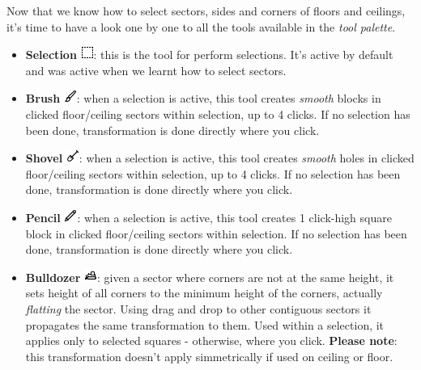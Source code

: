Now that we know how to select sectors, sides and corners of floors and ceilings, it's time to have a look one by one to all the tools available in the \emph{tool palette}.

\begin{itemize}
    \item \textbf{Selection} \includegraphics[scale=0.5]{Resources/icons_toolbox/toolbox_Selection-16.png}: this is the tool for perform selections. It's active by default and was active when we learnt how to select sectors.
    \item \textbf{Brush} \includegraphics[scale=0.5]{Resources/icons_toolbox/toolbox_Paint-16.png}: when a selection is active, this tool creates \emph{smooth} blocks in  clicked floor/ceiling sectors within selection, up to 4 clicks. If no selection has been done, transformation is done directly where you click.
    \item \textbf{Shovel} \includegraphics[scale=0.5]{Resources/icons_toolbox/toolbox_Shovel-16.png}: when a selection is active, this tool creates \emph{smooth} holes in  clicked floor/ceiling sectors within selection, up to 4 clicks. If no selection has been done, transformation is done directly where you click.
    \item \textbf{Pencil} \includegraphics[scale=0.5]{Resources/icons_toolbox/toolbox_Pencil-16.png}: when a selection is active, this tool creates 1 click-high square block in  clicked floor/ceiling sectors within selection. If no selection has been done, transformation is done directly where you click.
    \item \textbf{Bulldozer} \includegraphics[scale=0.5]{Resources/icons_toolbox/toolbox_Bulldozer_1-16.png}: given a sector where corners are not at the same height, it sets height of all corners to the minimum height of the corners, actually \emph{flatting} the sector. Using drag and drop to other contiguous sectors it propagates the same transformation to them. Used within a selection, it applies only to selected squares - otherwise, where you click. \textbf{Please note}: this transformation doesn't apply simmetrically if used on ceiling or floor.

\end{itemize}
